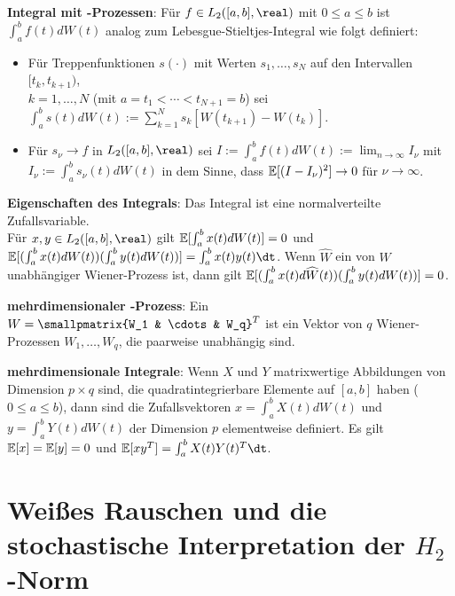 \linie
\pagebreak

\textbf{Integral mit -Prozessen}:
Für $f \in L_2([a, b], \real)$ mit $0 \le a \le b$ ist
$\int_a^b f(t) dW(t)$ analog zum Lebesgue-Stieltjes-Integral wie folgt definiert:
\begin{itemize}
    \item
    Für Treppenfunktionen $s(\cdot)$ mit Werten $s_1, \dotsc, s_N$ auf den Intervallen
    $[t_k, t_{k+1})$,\\
    $k = 1, \dotsc, N$ (mit $a = t_1 < \dotsb < t_{N+1} = b$) sei
    $\int_a^b s(t) dW(t) := \sum_{k=1}^N s_k [W(t_{k+1}) - W(t_k)]$.

    \item
    Für $s_\nu \to f$ in $L_2([a, b], \real)$ sei
    $I := \int_a^b f(t) dW(t) := \lim_{n \to \infty} I_\nu$ mit $I_\nu := \int_a^b s_\nu(t) dW(t)$
    in dem Sinne, dass $\mathbb{E}[(I - I_\nu)^2] \to 0$ für $\nu \to \infty$.
\end{itemize}

\textbf{Eigenschaften des Integrals}:
Das Integral ist eine normalverteilte Zufallsvariable.\\
Für $x, y \in L_2([a, b], \real)$ gilt
$\mathbb{E}[\int_a^b x(t) dW(t)] = 0$ und\\
$\EE[(\int_a^b x(t) dW(t)) (\int_a^b y(t) dW(t))] = \int_a^b x(t) y(t) \dt$.
Wenn $\widehat{W}$ ein von $W$ unabhängiger Wiener-Prozess ist, dann gilt
$\mathbb{E}[(\int_a^b x(t) d\widehat{W}(t)) (\int_a^b y(t) dW(t))] = 0$.

\linie

\textbf{mehrdimensionaler -Prozess}:
Ein \\
$W = \smallpmatrix{W_1 & \cdots & W_q}^T$
ist ein Vektor von $q$ Wiener-Prozessen $W_1, \dotsc, W_q$, die paarweise unabhängig sind.

\textbf{mehrdimensionale Integrale}:
Wenn $X$ und $Y$ matrixwertige Abbildungen von Dimension $p \times q$ sind,
die quadratintegrierbare Elemente auf $[a, b]$ haben ($0 \le a \le b$), dann sind die
Zufallsvektoren $x = \int_a^b X(t) dW(t)$ und $y = \int_a^b Y(t) dW(t)$ der Dimension $p$
elementweise definiert.
Es gilt $\mathbb{E}[x] = \mathbb{E}[y] = 0$ und $\EE[xy^T] = \int_a^b X(t) Y(t)^T \dt$.

\section{%
    Weißes Rauschen und die stochastische Interpretation der \texorpdfstring{$H_2$-Norm}{H₂-Norm}%
}

